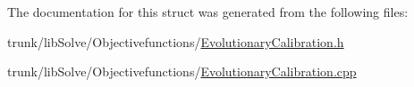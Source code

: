 \-The documentation for this struct was generated from the following files\-:\begin{DoxyCompactItemize}
\item 
trunk/lib\-Solve/\-Objectivefunctions/\hyperlink{_evolutionary_calibration_8h}{\-Evolutionary\-Calibration.\-h}\item 
trunk/lib\-Solve/\-Objectivefunctions/\hyperlink{_evolutionary_calibration_8cpp}{\-Evolutionary\-Calibration.\-cpp}\end{DoxyCompactItemize}
